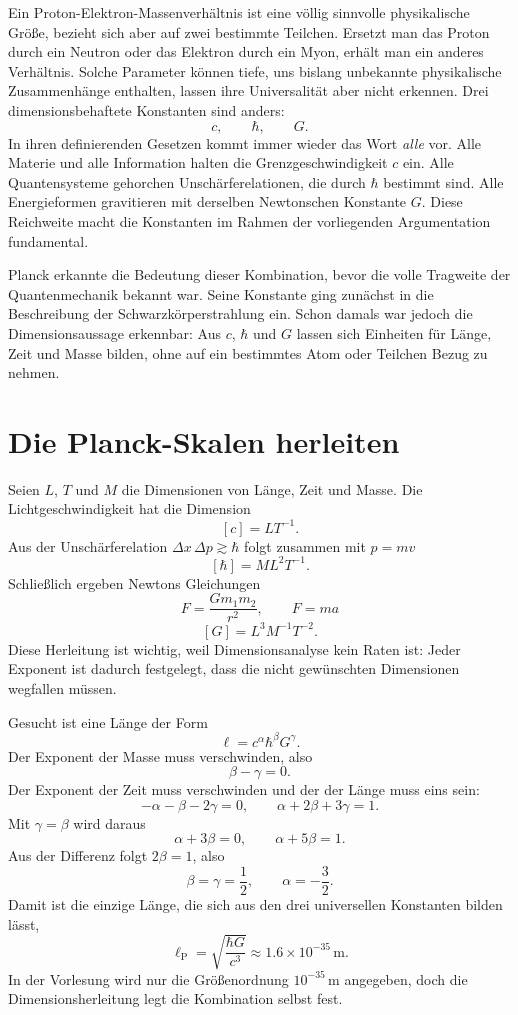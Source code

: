 Ein Proton-Elektron-Massenverhältnis ist eine völlig sinnvolle physikalische Größe, bezieht sich aber auf zwei bestimmte Teilchen. Ersetzt man das Proton durch ein Neutron oder das Elektron durch ein Myon, erhält man ein anderes Verhältnis. Solche Parameter können tiefe, uns bislang unbekannte physikalische Zusammenhänge enthalten, lassen ihre Universalität aber nicht erkennen. Drei dimensionsbehaftete Konstanten sind anders:
\[
c,\qquad \hbar,\qquad G.
\]
In ihren definierenden Gesetzen kommt immer wieder das Wort \emph{alle} vor. Alle Materie und alle Information halten die Grenzgeschwindigkeit \(c\) ein. Alle Quantensysteme gehorchen Unschärferelationen, die durch \(\hbar\) bestimmt sind. Alle Energieformen gravitieren mit derselben Newtonschen Konstante \(G\). Diese Reichweite macht die Konstanten im Rahmen der vorliegenden Argumentation fundamental.

Planck erkannte die Bedeutung dieser Kombination, bevor die volle Tragweite der Quantenmechanik bekannt war. Seine Konstante ging zunächst in die Beschreibung der Schwarzkörperstrahlung ein. Schon damals war jedoch die Dimensionsaussage erkennbar: Aus \(c\), \(\hbar\) und \(G\) lassen sich Einheiten für Länge, Zeit und Masse bilden, ohne auf ein bestimmtes Atom oder Teilchen Bezug zu nehmen.

\section{Die Planck-Skalen herleiten}

Seien \(L\), \(T\) und \(M\) die Dimensionen von Länge, Zeit und Masse. Die Lichtgeschwindigkeit hat die Dimension
\[
[c]=LT^{-1}.
\]
Aus der Unschärferelation \(\Delta x\,\Delta p\gtrsim\hbar\) folgt zusammen mit \(p=mv\)
\[
[\hbar]=ML^2T^{-1}.
\]
Schließlich ergeben Newtons Gleichungen
\[
F=\frac{Gm_1m_2}{r^2},
\qquad
F=ma
\]
\[
[G]=L^3M^{-1}T^{-2}.
\]
Diese Herleitung ist wichtig, weil Dimensionsanalyse kein Raten ist: Jeder Exponent ist dadurch festgelegt, dass die nicht gewünschten Dimensionen wegfallen müssen.

Gesucht ist eine Länge der Form
\begin{equation}
\ell=c^\alpha\hbar^\beta G^\gamma.
\label{eq:c10-length-ansatz}
\end{equation}
Der Exponent der Masse muss verschwinden, also
\[
\beta-\gamma=0.
\]
Der Exponent der Zeit muss verschwinden und der der Länge muss eins sein:
\[
-\alpha-\beta-2\gamma=0,
\qquad
\alpha+2\beta+3\gamma=1.
\]
Mit \(\gamma=\beta\) wird daraus
\[
\alpha+3\beta=0,
\qquad
\alpha+5\beta=1.
\]
Aus der Differenz folgt \(2\beta=1\), also
\[
\beta=\gamma=\frac12,
\qquad
\alpha=-\frac32.
\]
Damit ist die einzige Länge, die sich aus den drei universellen Konstanten bilden lässt,
\begin{equation}
\ell_{\mathrm P}
=\sqrt{\frac{\hbar G}{c^3}}
\approx 1.6\times10^{-35}\,\mathrm m.
\label{eq:c10-planck-length}
\end{equation}
In der Vorlesung wird nur die Größenordnung \(10^{-35}\,\mathrm m\) angegeben, doch die Dimensionsherleitung legt die Kombination selbst fest.

